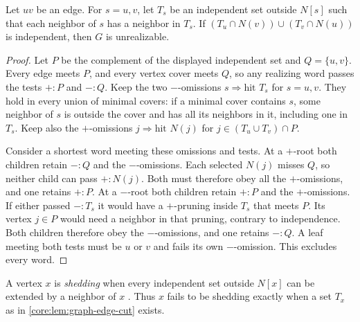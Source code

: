 \begin{lemma}\label{core:lem:graph-edge-cut}
Let $uv$ be an edge. For $s=u,v$, let $T_s$ be an independent set
outside $N[s]$ such that each neighbor of $s$ has a neighbor in $T_s$.
If $(T_u\cap N(v))\cup(T_v\cap N(u))$ is independent, then $G$
is unrealizable.
\end{lemma}
\begin{proof}
Let $P$ be the complement of the displayed independent set and
$Q=\{u,v\}$. Every edge meets $P$, and every vertex cover meets $Q$,
so any realizing word passes the tests $+:P$ and $-:Q$. Keep the two
$-$-omissions $s\Rightarrow\text{hit }T_s$ for $s=u,v$.
They hold in every union of minimal covers: if a minimal cover
contains $s$, some neighbor of $s$ is outside the cover and has
all its neighbors in it, including one in $T_s$. Keep also the
$+$-omissions $j\Rightarrow\text{hit }N(j)$ for
$j\in (T_u\cup T_v)\cap P$.

Consider a shortest word meeting these omissions and tests. At a
$+$-root both children retain $-:Q$ and the $-$-omissions. Each
selected $N(j)$ misses $Q$, so neither child can pass $+:N(j)$.
Both must therefore obey all the $+$-omissions, and one retains $+:P$.
At a $-$-root both children retain $+:P$ and the $+$-omissions.
If either passed $-:T_s$ it would have a $+$-pruning inside $T_s$
that meets $P$. Its vertex $j\in P$ would need a neighbor in that
pruning, contrary to independence. Both children therefore obey the
$-$-omissions, and one retains $-:Q$. A leaf meeting both tests must
be $u$ or $v$ and fails its own $-$-omission. This excludes every word.
\end{proof}

A vertex $x$ is \emph{shedding} when every independent set outside
$N[x]$ can be extended by a neighbor of $x$
\cite[Definition~5]{BiyikogluCivan2014}. Thus $x$ fails to be shedding
exactly when a set $T_x$ as in \cref{core:lem:graph-edge-cut} exists.

